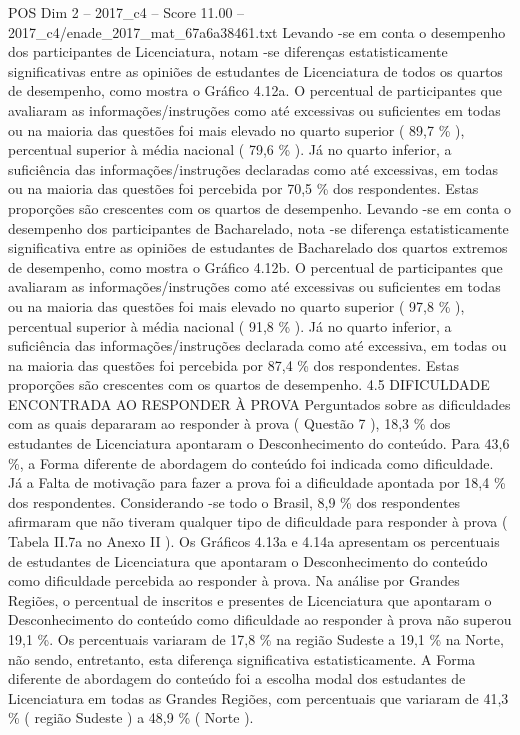\begin{textsample}{POS Dim 2 – 2017\_c4 – Score 11.00 – 2017\_c4/enade\_2017\_mat\_67a6a38461.txt}
Levando -se em conta o desempenho dos participantes de Licenciatura, notam -se diferenças estatisticamente significativas entre as opiniões de estudantes de Licenciatura de todos os quartos de desempenho, como mostra o Gráfico 4.12a.
O percentual de participantes que avaliaram as informações/instruções como até excessivas ou suficientes em todas ou na maioria das questões foi mais elevado no quarto superior ( 89,7 \% ), percentual superior à média nacional ( 79,6 \% ).
Já no quarto inferior, a suficiência das informações/instruções declaradas como até excessivas, em todas ou na maioria das questões foi percebida por 70,5 \% dos respondentes.
Estas proporções são crescentes com os quartos de desempenho.
Levando -se em conta o desempenho dos participantes de Bacharelado, nota -se diferença estatisticamente significativa entre as opiniões de estudantes de Bacharelado dos quartos extremos de desempenho, como mostra o Gráfico 4.12b.
O percentual de participantes que avaliaram as informações/instruções como até excessivas ou suficientes em todas ou na maioria das questões foi mais elevado no quarto superior ( 97,8 \% ), percentual superior à média nacional ( 91,8 \% ).
Já no quarto inferior, a suficiência das informações/instruções declarada como até excessiva, em todas ou na maioria das questões foi percebida por 87,4 \% dos respondentes.
Estas proporções são crescentes com os quartos de desempenho. 4.5 DIFICULDADE ENCONTRADA AO RESPONDER À PROVA Perguntados sobre as dificuldades com as quais depararam ao responder à prova ( Questão 7 ), 18,3 \% dos estudantes de Licenciatura apontaram o Desconhecimento do conteúdo.
Para 43,6 \%, a Forma diferente de abordagem do conteúdo foi indicada como dificuldade.
Já a Falta de motivação para fazer a prova foi a dificuldade apontada por 18,4 \% dos respondentes.
Considerando -se todo o Brasil, 8,9 \% dos respondentes afirmaram que não tiveram qualquer tipo de dificuldade para responder à prova ( Tabela II.7a no Anexo II ).
Os Gráficos 4.13a e 4.14a apresentam os percentuais de estudantes de Licenciatura que apontaram o Desconhecimento do conteúdo como dificuldade percebida ao responder à prova.
Na análise por Grandes Regiões, o percentual de inscritos e presentes de Licenciatura que apontaram o Desconhecimento do conteúdo como dificuldade ao responder à prova não superou 19,1 \%.
Os percentuais variaram de 17,8 \% na região Sudeste a 19,1 \% na Norte, não sendo, entretanto, esta diferença significativa estatisticamente.
A Forma diferente de abordagem do conteúdo foi a escolha modal dos estudantes de Licenciatura em todas as Grandes Regiões, com percentuais que variaram de 41,3 \% ( região Sudeste ) a 48,9 \% ( Norte ).

\end{textsample}

